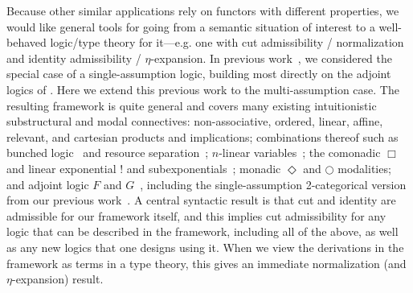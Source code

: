 \documentclass[a4paper,USenglish]{lipics-v2016}
\newcommand\citep[1]{\cite{#1}}
\newcommand\citet[1]{\cite{#1}}
\begin{document}
Because other similar applications rely on functors with different
properties, we would like general tools for going from a semantic
situation of interest to a well-behaved logic/type theory for
it---e.g. one with cut admissibility / normalization and identity
admissibility / $\eta$-expansion.  In previous work~\citep{ls16adjoint},
we considered the special case of a single-assumption logic, building
most directly on the adjoint logics of
\citet{benton94mixed,bentonwadler96adjoint,reed09adjoint}.  Here we
extend this previous work to the multi-assumption case.  The resulting
framework is quite general and covers many existing intuitionistic
substructural and modal connectives: non-associative, ordered, linear,
affine, relevant, and cartesian products and implications; combinations
thereof such as bunched logic~\citep{ohearnpym99bunched} and resource
separation~\citep{atkey04separation}; $n$-linear
variables~\citep{reed08namessubstructural,abel15modal,mcbride16nuttin};
the comonadic $\Box$ and linear exponential $!$ and
subexponentials~\citep{nigammiller09subexponentials,danos+93subexponentials};
monadic $\Diamond$ and $\bigcirc$ modalities; and adjoint logic $F$ and
$G$~\citep{benton94mixed,bentonwadler96adjoint,reed09adjoint}, including
the single-assumption 2-categorical version from our previous
work~\citep{ls16adjoint}.  A central syntactic result is that cut and
identity are admissible for our framework itself, and this implies cut
admissibility for any logic that can be described in the framework,
including all of the above, as well as any new logics that one designs
using it.  When we view the derivations in the framework as terms in a
type theory, this gives an immediate normalization (and
$\eta$-expansion) result.
\end{document}
